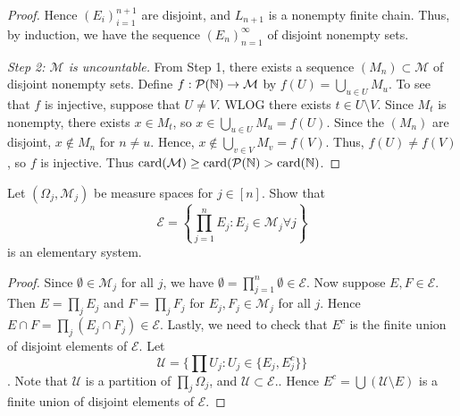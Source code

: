 \documentclass{article}
\begin{document}
\begin{proof}
 Hence $(E_i)_{i=1}^{n+1}$ are disjoint, and $L_{n+1}$ is a nonempty finite chain. Thus, by induction, we have the sequence $(E_n)_{n=1}^\infty$ of disjoint nonempty sets.

\emph{Step 2: $\mathcal M$ is uncountable.} 
From Step 1, there exists a sequence $(M_n) \subset \mathcal M$ of disjoint nonempty sets. Define $f : \mathcal P (\mathbb{N}) \to \mathcal M$ by $f(U) = \bigcup_{u \in U} M_u$.  To see that $f$ is injective, suppose that $U \neq V$.  WLOG there exists $t \in U \setminus V$.  Since $M_t$ is nonempty, there exists $x \in M_t$, so $x \in \bigcup_{u \in U} M_u = f(U) $. Since the $(M_n)$ are disjoint, $x \not\in M_n$ for $n \neq u$.  
Hence, $x \not\in \bigcup_{v\in V} M_v = f(V)$.  Thus, $f(U) \neq f(V)$, so $f$ is injective.  Thus $\operatorname{card}(\mathcal M) \ge \operatorname{card}(\mathcal P (\mathbb{N}) > \operatorname{card}(\mathbb{N})$.
\end{proof}


 Let $(\Omega_j , \mathcal M_j)$ be measure spaces for $j \in [n]$. Show that 
$$ \mathcal E = \left\{ \prod_{j=1}^n E_j : E_j \in \mathcal M_j \forall j \right\} $$
is an elementary system.

\begin{proof}
Since $\emptyset \in \mathcal M_j$ for all $j$, we have $\emptyset = \prod_{j=1}^n \emptyset \in \mathcal E$. Now suppose $E, F \in \mathcal E$. Then $E = \prod_j E_j$ and $F = \prod_j F_j$ for $E_j, F_j \in \mathcal M_j$ for all $j$. Hence $E \cap F = \prod_j (E_j \cap F_j) \in \mathcal E$.  Lastly, we need to check that $E^c$ is the finite union of disjoint elements of $\mathcal E$. Let 
$$\mathcal U = \{\prod U_j : U_j \in \{E_j, E_j^c \} \}$$.
Note that $\mathcal U$ is a partition of $\prod_j \Omega_j$, and $\mathcal U \subset \mathcal E$..  Hence $E^c = \bigcup (\mathcal U \setminus {E})$ is a finite union of disjoint elements of $\mathcal E$.
\end{proof}
\end{document}
